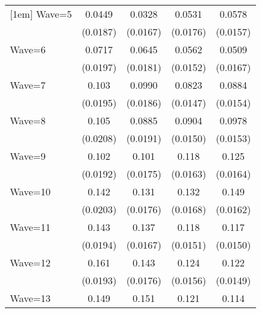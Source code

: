 {\begin{tabular}{l*{4}{c}}
[1em]
Wave=5              &      0.0449\sym{*}  &      0.0328         &      0.0531\sym{**} &      0.0578\sym{***}\\
                    &    (0.0187)         &    (0.0167)         &    (0.0176)         &    (0.0157)         \\
[1em]
Wave=6              &      0.0717\sym{***}&      0.0645\sym{***}&      0.0562\sym{***}&      0.0509\sym{**} \\
                    &    (0.0197)         &    (0.0181)         &    (0.0152)         &    (0.0167)         \\
[1em]
Wave=7              &       0.103\sym{***}&      0.0990\sym{***}&      0.0823\sym{***}&      0.0884\sym{***}\\
                    &    (0.0195)         &    (0.0186)         &    (0.0147)         &    (0.0154)         \\
[1em]
Wave=8              &       0.105\sym{***}&      0.0885\sym{***}&      0.0904\sym{***}&      0.0978\sym{***}\\
                    &    (0.0208)         &    (0.0191)         &    (0.0150)         &    (0.0153)         \\
[1em]
Wave=9              &       0.102\sym{***}&       0.101\sym{***}&       0.118\sym{***}&       0.125\sym{***}\\
                    &    (0.0192)         &    (0.0175)         &    (0.0163)         &    (0.0164)         \\
[1em]
Wave=10             &       0.142\sym{***}&       0.131\sym{***}&       0.132\sym{***}&       0.149\sym{***}\\
                    &    (0.0203)         &    (0.0176)         &    (0.0168)         &    (0.0162)         \\
[1em]
Wave=11             &       0.143\sym{***}&       0.137\sym{***}&       0.118\sym{***}&       0.117\sym{***}\\
                    &    (0.0194)         &    (0.0167)         &    (0.0151)         &    (0.0150)         \\
[1em]
Wave=12             &       0.161\sym{***}&       0.143\sym{***}&       0.124\sym{***}&       0.122\sym{***}\\
                    &    (0.0193)         &    (0.0176)         &    (0.0156)         &    (0.0149)         \\
[1em]
Wave=13             &       0.149\sym{***}&       0.151\sym{***}&       0.121\sym{***}&       0.114\sym{***}\\

\end{tabular}}
